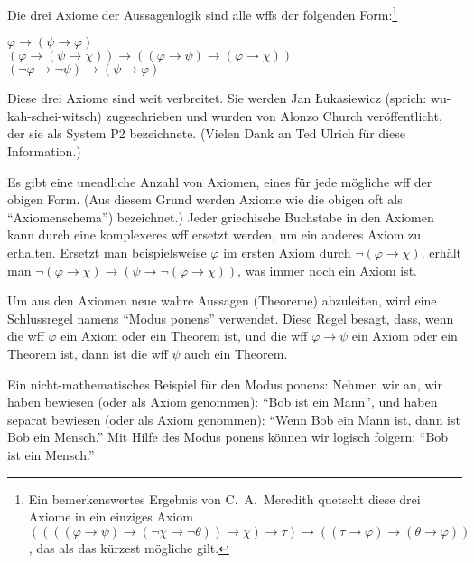Die drei Axiome der Aussagenlogik sind alle wffs der folgenden Form:\footnote{Ein bemerkenswertes Ergebnis von C.~A.~Meredith quetscht diese drei Axiome in ein einziges Axiom $((((\varphi\rightarrow \psi)\rightarrow(\neg \chi\rightarrow\neg\theta))\rightarrow \chi)\rightarrow \tau)\rightarrow((\tau\rightarrow\varphi)\rightarrow(\theta\rightarrow \varphi))$ \cite{CAMeredith}, das als das kürzest mögliche gilt. }
\begin{center}
     $\varphi\rightarrow(\psi\rightarrow \varphi)$\\

     $(\varphi\rightarrow (\psi\rightarrow \chi))\rightarrow
((\varphi\rightarrow  \psi)\rightarrow (\varphi\rightarrow \chi))$\\

     $(\neg \varphi\rightarrow \neg\psi)\rightarrow (\psi\rightarrow
\varphi)$
\end{center}

Diese drei Axiome sind weit verbreitet. Sie werden Jan {\L}ukasiewicz (sprich: wu-kah-schei-witsch) zugeschrieben und wurden von Alonzo Church veröffentlicht, der sie als System P2 bezeichnete. (Vielen Dank an Ted Ulrich für diese Information.)

Es gibt eine unendliche Anzahl von Axiomen, eines für jede mögliche wff der obigen Form.  (Aus diesem Grund werden Axiome wie die obigen oft als "`Axiomenschema"') bezeichnet.)  Jeder griechische Buchstabe in den Axiomen kann durch eine komplexeres wff ersetzt werden, um ein anderes Axiom zu erhalten.  Ersetzt man beispielsweise $\varphi$ im ersten Axiom durch $\neg(\varphi\rightarrow\chi)$, erhält man $\neg(\varphi\rightarrow\chi)\rightarrow(\psi\rightarrow\neg(\varphi\rightarrow\chi))$, was immer noch ein Axiom ist.

Um aus den Axiomen neue wahre Aussagen (Theoreme) abzuleiten, wird eine Schlussregel namens "`Modus ponens"' verwendet.  Diese Regel besagt, dass, wenn die wff $\varphi$ ein Axiom oder ein Theorem ist, und die wff $\varphi\rightarrow\psi$ ein Axiom oder ein Theorem ist, dann ist die wff $\psi$ auch ein Theorem.

Ein nicht-mathematisches Beispiel für den Modus ponens: Nehmen wir an, wir haben bewiesen (oder als Axiom genommen): "`Bob ist ein Mann"', und haben separat bewiesen (oder als Axiom genommen): "`Wenn Bob ein Mann ist, dann ist Bob ein Mensch."'  Mit Hilfe des Modus ponens können wir logisch folgern: "`Bob ist ein Mensch."'

